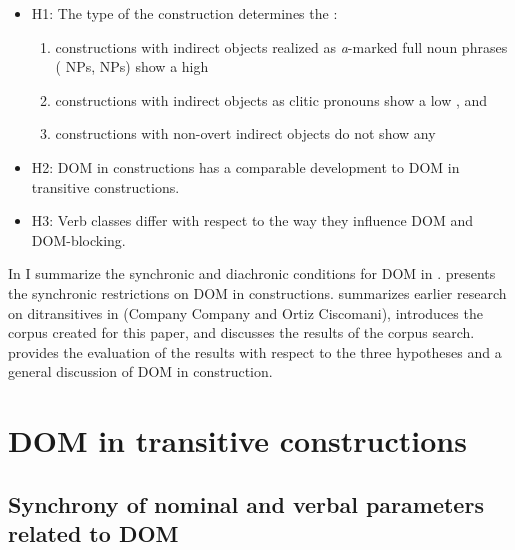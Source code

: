 \documentclass[output=paper]{LSP/langsci}
\begin{document}
\begin{itemize}
\item H1: The type of the  construction determines the :
\begin{enumerate}[label=\roman*]
 \item constructions with indirect objects realized as \textit{a}-marked full noun phrases ( NPs,  NPs) show a high 
 \item constructions with indirect objects as clitic pronouns show a low , and
 \item constructions with non-overt indirect objects do not show any  
\end{enumerate}
\item H2: DOM in  constructions has a comparable development to DOM in transitive constructions.
\item H3: Verb classes differ with respect to the way they influence DOM and DOM-blocking.
\end{itemize}

In  I summarize the synchronic and diachronic conditions for DOM in .  presents the synchronic restrictions on DOM in  constructions.  summarizes earlier research on ditransitives in  (Company Company and Ortiz Ciscomani), introduces the corpus created for this paper, and discusses the results of the corpus search.  provides the evaluation of the results with respect to the three hypotheses and a general discussion of DOM in  construction.

\section{DOM in transitive constructions} %
\label{11-he-sec:2}
\subsection{Synchrony of nominal and verbal parameters related to DOM} %
\label{11-subsec:2-1}
\end{document}
